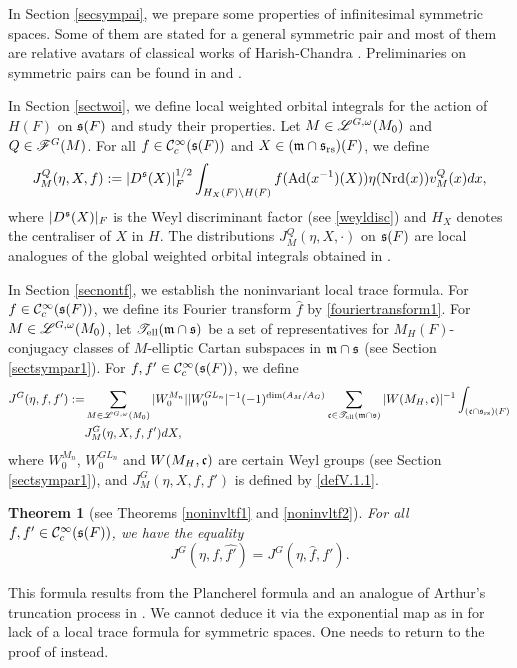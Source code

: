 \documentclass[a4paper]{amsart}
\newcommand{\fm}{{\mathfrak{m}}} \newcommand{\fn}{{\mathfrak{n}}}\newcommand{\fo}{{\mathfrak{o}}} \newcommand{\fp}{{\mathfrak{p}}}
\newtheorem{thm}{Theorem}[section]
\theoremstyle{definition}
\theoremstyle{remark}
\numberwithin{equation}{subsection}
\begin{document}
In Section \ref{secsympai}, we prepare some properties of infinitesimal symmetric spaces. Some of them are stated for a general symmetric pair and most of them are relative avatars of classical works of Harish-Chandra \cite{MR0414797}. Preliminaries on symmetric pairs can be found in \cite{MR1375304} and \cite{MR2553879}. 

In Section \ref{sectwoi}, we define local weighted orbital integrals for the action of $H(F)$ on ${\mathfrak{s}}(F)$ and study their properties. Let $M\in\mathscr{L}^{G,\omega}(M_0)$ and $Q\in\mathscr{F}^G(M)$. For all $f\in{\mathcal {C}}_c^\infty({\mathfrak{s}}(F))$ and $X\in(\fm\cap\fs_\rs)(F)$, we define 
$$ J_M^Q(\eta, X, f):=|D^{\mathfrak{s}}(X)|_F^{1/2} \int_{H_X(F)\backslash H(F)} f({\mathrm{Ad}}(x^{-1})(X)) \eta({\mathrm{Nrd}}(x)) v_M^Q(x) dx,   $$
where $|D^{\mathfrak{s}}(X)|_F$ is the Weyl discriminant factor (see \eqref{weyldisc}) and $H_X$ denotes the centraliser of $X$ in $H$. The distributions $J_M^Q(\eta, X, \cdot)$ on ${\mathfrak{s}}(F)$ are local analogues of the global weighted orbital integrals obtained in \cite[Theorem 9.2]{zbMATH07499568}.  

In Section \ref{secnontf}, we establish the noninvariant local trace formula. For $f\in{\mathcal {C}}_c^\infty({\mathfrak{s}}(F))$, we define its Fourier transform $\hat{f}$ by \eqref{fouriertransform1}. For $M\in\mathscr{L}^{G,\omega}(M_0)$, let $\mst_\el(\fm\cap\fs)$ be a set of representatives for $M_H(F)$-conjugacy classes of $M$-elliptic Cartan subspaces in $\fm\cap\fs$ (see Section \ref{sectsympar1}). 
For $f, f'\in{\mathcal {C}}_c^\infty({\mathfrak{s}}(F))$, we define 
\[\begin{split}
 J^G(\eta, f, f'):=&\sum_{M\in\msl^{G,\omega}(M_0)} |W_0^{M_n}| |W_0^{GL_n}|^{-1} (-1)^{\dim(A_M/A_G)} \sum_{\fc\in\mst_\el(\fm\cap\fs)} |W(M_H, \fc)|^{-1} \int_{(\fc\cap\fs_\rs)(F)} \\ 
&J_M^G(\eta, X, f, f') dX, 
\end{split}\]
where $W_0^{M_n}$, $W_0^{GL_n}$ and $W(M_H, {\mathfrak{c}})$ are certain Weyl groups (see Section \ref{sectsympar1}), and $J_M^G(\eta, X, f, f')$ is defined by \eqref{defV.1.1}. 

\begin{thm}[see Theorems \ref{noninvltf1} and \ref{noninvltf2}]
For all $f, f'\in{\mathcal {C}}_c^\infty({\mathfrak{s}}(F))$, we have the equality
$$ J^G(\eta, f, \hat{f'})=J^G(\eta, \hat{f}, f'). $$
\end{thm}

This formula results from the Plancherel formula and an analogue of Arthur's truncation process in \cite{MR1114210}. We cannot deduce it via the exponential map as in \cite[\S V]{MR1344131} for lack of a local trace formula for symmetric spaces. One needs to return to the proof of \cite{MR1114210} instead. 
\end{document}
